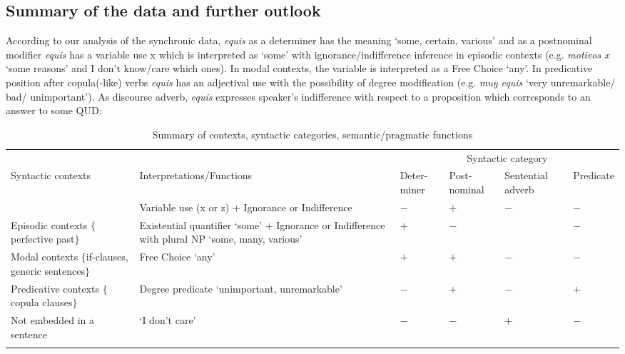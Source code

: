 \documentclass[output=paper
,modfonts
,nonflat]{langsci/langscibook}
\begin{document}
\subsection{Summary of the data and further outlook}\label{sec:kellert:2.5}
According to our analysis of the synchronic data, \textit{equis} as a determiner has the meaning ‘some, certain, various’ and as a postnominal modifier \textit{equis} has a variable use x which is interpreted as ‘some’ with ignorance/indifference inference in episodic contexts (e.g. \textit{motivos x} ‘some reasons’ and I don’t know/care which ones). In modal contexts, the variable is interpreted as a Free Choice ‘any’. In predicative position after copula(-like) verbs \textit{equis} has an adjectival use with the possibility of degree modification (e.g. \textit{muy equis} ‘very unremarkable/ bad/ unimportant’). As discourse adverb, \textit{equis} expresses speaker’s indifference with respect to a proposition which corresponds to an answer to some QUD:

\begin{table}\footnotesize
\caption{Summary of contexts, syntactic categories, semantic/pragmatic functions}
\label{tab:4:Summary contexts}
 \begin{tabular}{p{2cm} p{2.75cm} p{1.1cm} p{1.1cm} p{1.1cm} p{1.1cm}}
  \lsptoprule
     &  &  \multicolumn{4}{c}{Syntactic category}\\\cmidrule(lr){3-6}
  \raggedright {Syntactic contexts}  & {Interpretations\slash Functions}\cellcolor[gray]{0.9} & {Deter-miner} & {Post-nominal}\cellcolor[gray]{0.9} & {Sentential adverb} & {Predicate}\cellcolor[gray]{0.9}\\
  \midrule
     & \raggedright Variable use (x or z) + Ignorance or Indifference\cellcolor[gray]{0.9} & $-$ & $+$\cellcolor[gray]{0.9} & $-$ & $-$\cellcolor[gray]{0.9}\\
  \midrule
   \raggedright Episodic contexts $\lbrace$perfective past$\rbrace$  & \raggedright Existential quantifier ‘some’ +  Ignorance or Indifference with plural NP ‘some, many, various’\cellcolor[gray]{0.9} & $+$ & $-$\cellcolor[gray]{0.9} &  & $-$\cellcolor[gray]{0.9}\\
  \midrule
   \raggedright Modal contexts $\lbrace$if-clauses, generic sentences$\rbrace$ & Free Choice ‘any’\cellcolor[gray]{0.9} & $+$ & $+$\cellcolor[gray]{0.9} & $-$ & $-$\cellcolor[gray]{0.9}\\
  \midrule
   \raggedright Predicative contexts $\lbrace$copula clauses$\rbrace$ & \raggedright Degree predicate ‘unimportant, unremarkable’\cellcolor[gray]{0.9} & $-$ & $+$\cellcolor[gray]{0.9} & $-$ & $+$\cellcolor[gray]{0.9}\\
  \midrule  
   \raggedright Not embedded in a sentence  & \raggedright ‘I don’t care’\cellcolor[gray]{0.9} & $-$ & $-$\cellcolor[gray]{0.9} & $+$ & $-$\cellcolor[gray]{0.9}\\
  \lspbottomrule
 \end{tabular}
\end{table}
\end{document}

